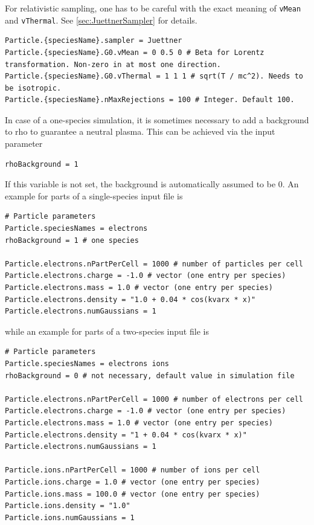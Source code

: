 \documentclass[11pt]{article}
\begin{document}
For relativistic sampling, one has to be careful with the exact meaning of \verb|vMean| and \verb|vThermal|. See \ref{sec:JuettnerSampler} for details.
\begin{lstlisting}[language=pkgconfig]
Particle.{speciesName}.sampler = Juettner
Particle.{speciesName}.G0.vMean = 0 0.5 0 # Beta for Lorentz transformation. Non-zero in at most one direction.
Particle.{speciesName}.G0.vThermal = 1 1 1 # sqrt(T / mc^2). Needs to be isotropic.
Particle.{speciesName}.nMaxRejections = 100 # Integer. Default 100.
\end{lstlisting}

In case of a one-species simulation, it is sometimes necessary to add a background to rho to guarantee a neutral plasma. This can be achieved via the input parameter 

\begin{lstlisting}
rhoBackground = 1
\end{lstlisting}

If this variable is not set, the background is automatically assumed to be 0. 
An example for parts of a single-species input file is

\begin{lstlisting}[language=pkgconfig]
# Particle parameters
Particle.speciesNames = electrons
rhoBackground = 1 # one species

Particle.electrons.nPartPerCell = 1000 # number of particles per cell
Particle.electrons.charge = -1.0 # vector (one entry per species)
Particle.electrons.mass = 1.0 # vector (one entry per species)
Particle.electrons.density = "1.0 + 0.04 * cos(kvarx * x)"
Particle.electrons.numGaussians = 1
\end{lstlisting}

while an example for parts of a two-species input file is

\begin{lstlisting}[language=pkgconfig]
# Particle parameters
Particle.speciesNames = electrons ions
rhoBackground = 0 # not necessary, default value in simulation file
    
Particle.electrons.nPartPerCell = 1000 # number of electrons per cell
Particle.electrons.charge = -1.0 # vector (one entry per species)
Particle.electrons.mass = 1.0 # vector (one entry per species)
Particle.electrons.density = "1 + 0.04 * cos(kvarx * x)"
Particle.electrons.numGaussians = 1
    
Particle.ions.nPartPerCell = 1000 # number of ions per cell 
Particle.ions.charge = 1.0 # vector (one entry per species)
Particle.ions.mass = 100.0 # vector (one entry per species)
Particle.ions.density = "1.0" 
Particle.ions.numGaussians = 1
\end{lstlisting}
\end{document}
